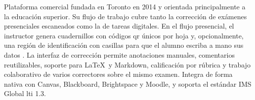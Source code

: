 Plataforma comercial fundada en Toronto en 2014 y orientada principalmente
a la educación superior. Su flujo de trabajo cubre tanto la corrección de
exámenes presenciales escaneados como la de tareas digitales. En el flujo
presencial, el instructor genera cuadernillos con códigos \acs{qr} únicos
por hoja y, opcionalmente, una región de identificación con casillas para
que el alumno escriba a mano sus datos \cite{crowdmark}. La interfaz de
corrección permite anotaciones manuales, comentarios reutilizables, soporte
para \LaTeX\ y Markdown, calificación por rúbrica y trabajo colaborativo de
varios correctores sobre el mismo examen. Integra de forma nativa con Canvas,
Blackboard, Brightspace y Moodle, y soporta el estándar IMS Global \ac{lti} 1.3.
